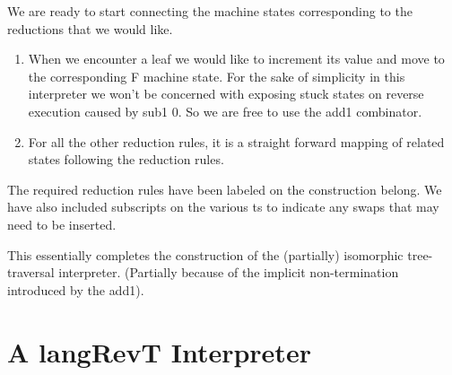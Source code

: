 \documentclass{llncs}
\begin{document}
{We are ready to start connecting the machine states corresponding to
the reductions that we would like. 

\begin{enumerate}

\item 
When we encounter a leaf we would like to increment its value and move
to the corresponding {{F}} machine state. For the sake of simplicity
in this interpreter we won't be concerned with exposing stuck states
on reverse execution caused by {{sub1 0}}. So we are free to use the
{{add1}} combinator.

\item
For all the other reduction rules, it is a straight forward mapping of
related states following the reduction rules. 

\end{enumerate}

The required reduction rules have been labeled on the construction
belong. We have also included subscripts on the various {{t}}s to
indicate any swaps that may need to be inserted.

\begin{center}
\end{center}

This essentially completes the construction of the (partially)
isomorphic tree-traversal interpreter. (Partially because of the
implicit non-termination introduced by the {{add1}}).


\section{A {{langRevT}} Interpreter}

}
\end{document}
